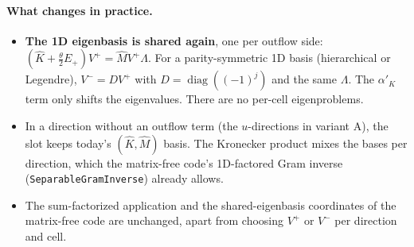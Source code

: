 \documentclass[11pt]{article}
\theoremstyle{remark}
\DeclareMathOperator{\diag}{diag}
\begin{document}
\paragraph{What changes in practice.}
\begin{itemize}[nosep]
  \item \textbf{The 1D eigenbasis is shared again}, one per outflow side: $(\widehat K+\tfrac\theta2E_+)V^+=\widehat MV^+\Lambda$.
        For a parity-symmetric 1D basis (hierarchical or Legendre), $V^-=DV^+$ with $D=\diag((-1)^j)$ and the same
        $\Lambda$.  The $\alpha'_K$ term only shifts the eigenvalues.  There are no per-cell eigenproblems.
  \item In a direction without an outflow term (the $u$-directions in variant A), the slot keeps today's
        $(\widehat K,\widehat M)$ basis.  The Kronecker product mixes the bases per direction, which the matrix-free
        code's 1D-factored Gram inverse (\texttt{Separable\-Gram\-Inverse}) already allows.
  \item The sum-factorized application and the shared-eigenbasis coordinates of the matrix-free code are unchanged,
        apart from choosing $V^+$ or $V^-$ per direction and cell.
\end{itemize}
\end{document}
